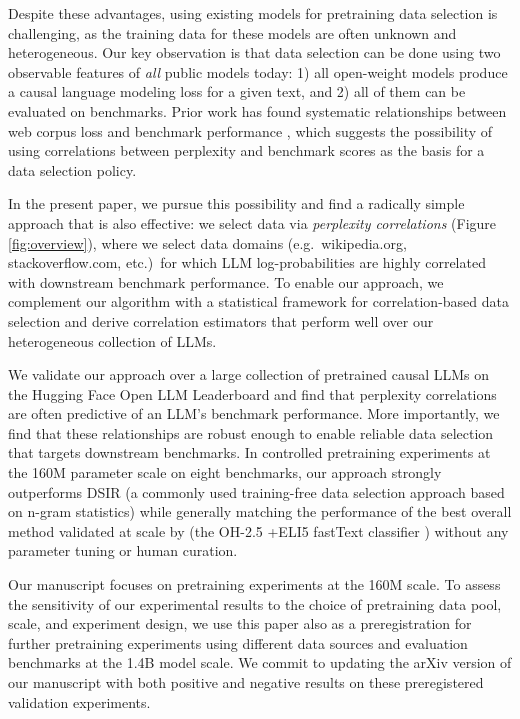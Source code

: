 \documentclass{article} %
\begin{document}
Despite these advantages, using existing models for pretraining data selection is challenging, as the training data for these models are often unknown and heterogeneous. Our key observation is that data selection can be done using two observable features of \emph{all} public models today: 1) all open-weight models produce a causal language modeling loss for a given text, and 2) all of them can be evaluated on benchmarks. Prior work has found systematic relationships between web corpus loss and benchmark performance \citep{wei2022emergent}, which suggests the possibility of using correlations between perplexity and benchmark scores as the basis for a data selection policy.

In the present paper, we pursue this possibility and find a radically simple approach that is also effective: we select data via \emph{perplexity correlations} (Figure \ref{fig:overview}), where we select data domains (e.g.\ wikipedia.org, stackoverflow.com, etc.)\ for which LLM log-probabilities are highly correlated with downstream benchmark performance. To enable our approach, we complement our algorithm with a statistical framework for correlation-based data selection and derive correlation estimators that perform well over our heterogeneous collection of LLMs.

We validate our approach over a large collection of pretrained causal LLMs on the Hugging Face Open LLM Leaderboard \citep{openllmleaderboard} and find that perplexity correlations are often predictive of an LLM's benchmark performance. More importantly, we find that these relationships are robust enough to enable reliable data selection that targets downstream benchmarks. In controlled pretraining experiments at the 160M parameter scale on eight benchmarks, our approach strongly outperforms DSIR \citep{dsir} (a commonly used training-free data selection approach based on n-gram statistics) while generally matching the performance of the best overall method validated at scale by \citeauthor{datacomp} (the OH-2.5 +ELI5 fastText classifier \citep{fasttext}) without any parameter tuning or human curation.

Our manuscript focuses on pretraining experiments at the 160M scale. To assess the sensitivity of our experimental results to the choice of pretraining data pool, scale, and experiment design, we use this paper also as a preregistration for further pretraining experiments using different data sources and evaluation benchmarks at the 1.4B model scale. We commit to updating the arXiv version of our manuscript with both positive and negative results on these preregistered validation experiments.
\end{document}
